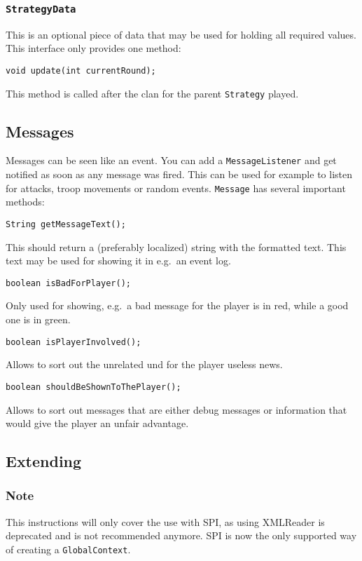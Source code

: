 \documentclass{article}
\begin{document}
\subsubsection{\texttt{StrategyData}}
This is an optional piece of data that may be used for holding all required values. This interface only provides one method:
\begin{verbatim}
void update(int currentRound);
\end{verbatim}
This method is called after the clan for the parent \texttt{Strategy} played.

\subsection{Messages}
Messages can be seen like an event. You can add a \texttt{MessageListener} and get notified as soon as any message was fired. This can be used for example to listen for attacks, troop movements or random events.
\texttt{Message} has several important methods:
\begin{verbatim}
String getMessageText();
\end{verbatim}
This should return a (preferably localized) string with the formatted text. This text may be used for showing it in e.g.\ an event log.
\begin{verbatim}
boolean isBadForPlayer();
\end{verbatim}
Only used for showing, e.g.\ a bad message for the player is in red, while a good one is in green.
\begin{verbatim}
boolean isPlayerInvolved();
\end{verbatim}
Allows to sort out the unrelated und for the player useless news.
\begin{verbatim}
boolean shouldBeShownToThePlayer();
\end{verbatim}
Allows to sort out messages that are either debug messages or information that would give the player an unfair advantage.
\newpage


\subsection{Extending}
\subsubsection{Note}
This instructions will only cover the use with SPI, as using XMLReader is deprecated and is not recommended anymore.\newline
SPI is now the only supported way of creating a \texttt{GlobalContext}.
\end{document}
